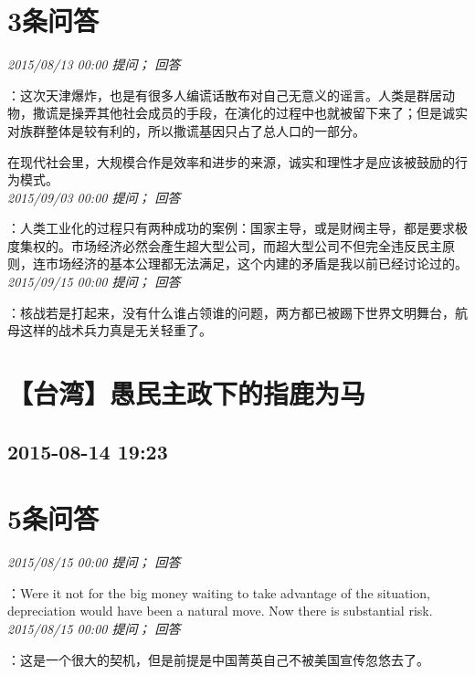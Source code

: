 \documentclass[twocolumn]{ctexart}
\begin{document}
\section{3条问答}

\textit{\hfill\noindent\small 2015/08/13 00:00 提问； 回答}

：这次天津爆炸，也是有很多人编谎话散布对自己无意义的谣言。人类是群居动物，撒谎是操弄其他社会成员的手段，在演化的过程中也就被留下来了；但是诚实对族群整体是较有利的，所以撒谎基因只占了总人口的一部分。

在现代社会里，大规模合作是效率和进步的来源，诚实和理性才是应该被鼓励的行为模式。\\

\textit{\hfill\noindent\small 2015/09/03 00:00 提问； 回答}

：人类工业化的过程只有两种成功的案例：国家主导，或是财阀主导，都是要求极度集权的。市场经济必然会產生超大型公司，而超大型公司不但完全违反民主原则，连市场经济的基本公理都无法满足，这个内建的矛盾是我以前已经讨论过的。\\

\textit{\hfill\noindent\small 2015/09/15 00:00 提问； 回答}

：核战若是打起来，没有什么谁占领谁的问题，两方都已被踢下世界文明舞台，航母这样的战术兵力真是无关轻重了。\\


\section{【台湾】愚民主政下的指鹿为马}
\subsection{2015-08-14 19:23}


\section{5条问答}

\textit{\hfill\noindent\small 2015/08/15 00:00 提问； 回答}

：Were it not for the big money waiting to take advantage of the situation, depreciation would have been a natural move. Now there is substantial risk.\\

\textit{\hfill\noindent\small 2015/08/15 00:00 提问； 回答}

：这是一个很大的契机，但是前提是中国菁英自己不被美国宣传忽悠去了。\\
\end{document}
